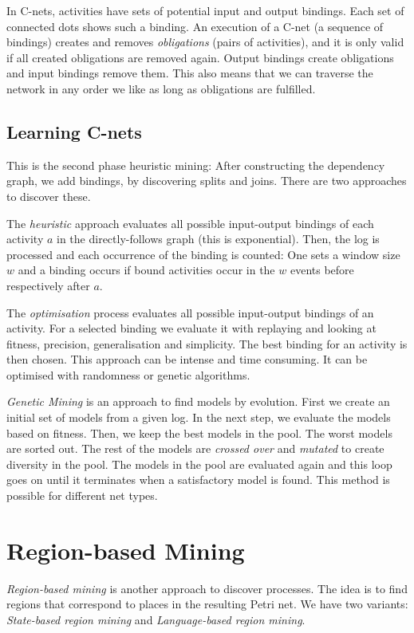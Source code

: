 \documentclass[english]{panikzettel}
\begin{document}
In C-nets, activities have sets of potential input and output bindings.
Each set of connected dots shows such a binding.
An execution of a C-net (a sequence of bindings) creates and removes \emph{obligations} (pairs of activities), and it is only valid if all created obligations are removed again.
Output bindings create obligations and input bindings remove them.
This also means that we can traverse the network in any order we like as long as obligations are fulfilled.

\subsection{Learning C-nets}
This is the second phase heuristic mining: After constructing the dependency graph, we add bindings, by discovering splits and joins.
There are two approaches to discover these.

The \emph{heuristic} approach evaluates all possible input-output bindings of each activity $a$ in the directly-follows graph (this is exponential).
Then, the log is processed and each occurrence of the binding is counted: One sets a window size $w$ and a binding occurs if bound activities occur in the $w$ events before respectively after $a$.

The \emph{optimisation} process evaluates all possible input-output bindings of an activity. For a selected binding we evaluate it with replaying and looking at fitness, precision, generalisation and simplicity. The best binding for an activity is then chosen. This approach can be intense and time consuming. It can be optimised with randomness or genetic algorithms.

\emph{Genetic Mining} is an approach to find models by evolution. First we create an initial set of models from a given log. In the next step, we evaluate the models based on fitness. Then, we keep the best models in the pool. The worst models are sorted out. The rest of the models are \emph{crossed over} and \emph{mutated} to create diversity in the pool. The models in the pool are evaluated again and this loop goes on until it terminates when a satisfactory model is found. This method is possible for different net types.

\section{Region-based Mining}

\emph{Region-based mining} is another approach to discover processes.
The idea is to find regions that correspond to places in the resulting Petri net.
We have two variants: \emph{State-based region mining} and \emph{Language-based region mining}.
\end{document}
